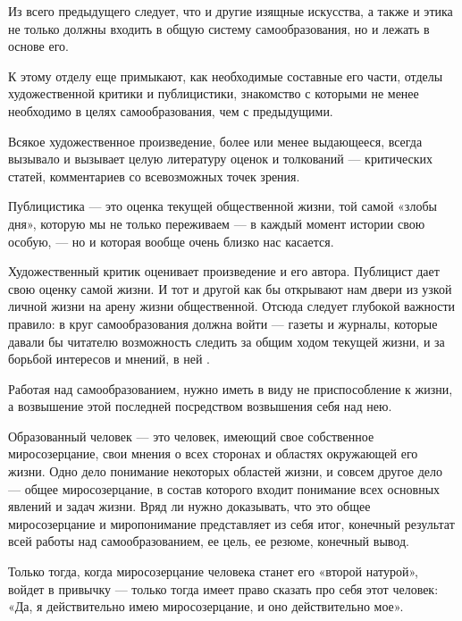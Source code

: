 Из всего предыдущего следует, что  и другие изящные искусства, а также и этика не только должны входить в общую систему самообразования, но и лежать в основе его.

К этому отделу еще примыкают, как необходимые составные его части, отделы художественной критики и публицистики, знакомство с которыми не менее необходимо в целях самообразования, чем с предыдущими.

Всякое художественное произведение, более или менее выдающееся, всегда вызывало и вызывает целую литературу оценок и толкований --- критических статей, комментариев со всевозможных точек зрения.

Публицистика --- это оценка текущей общественной жизни, той самой «злобы дня», которую мы не только переживаем --- в каждый момент истории свою особую, --- но и которая вообще очень близко нас касается.

Художественный критик оценивает произведение и его автора. Публицист дает свою оценку самой жизни. И тот и другой как бы открывают нам двери из узкой  личной жизни на арену жизни общественной. Отсюда следует глубокой важности правило: в круг самообразования должна войти  --- газеты и журналы, которые давали бы читателю возможность следить за общим ходом текущей жизни, и за борьбой интересов и мнений, в ней .

Работая над самообразованием, нужно иметь в виду не приспособление к жизни, а возвышение этой последней посредством возвышения себя над нею.

Образованный человек --- это человек, имеющий свое собственное миросозерцание, свои мнения о всех сторонах и областях окружающей его жизни. Одно дело понимание некоторых областей жизни, и совсем другое дело --- общее миросозерцание, в состав которого входит понимание всех основных явлений и задач жизни. Вряд ли нужно доказывать, что это общее миросозерцание и миропонимание представляет из себя итог, конечный результат всей работы над самообразованием, ее цель, ее резюме, конечный вывод.

Только тогда, когда миросозерцание человека станет его «второй натурой», войдет в привычку --- только тогда имеет право сказать про себя этот человек: «Да, я действительно имею миросозерцание, и оно действительно мое».

